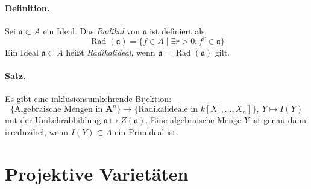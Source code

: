 \documentclass[11pt,b5paper,openany]{memoir}
\begin{document}
\paragraph{Definition.} Sei $\mathfrak{a}\subset A$ ein Ideal. Das \textit{Radikal} von $\mathfrak{a}$ ist definiert als:
\[\operatorname{Rad}(\mathfrak{a})=\{f\in A\mid\exists r>0\colon f^r\in\mathfrak{a} \} \]
Ein Ideal $\mathfrak{a}\subset A$ heißt \textit{Radikalideal}, wenn $\mathfrak{a}=\operatorname{Rad}(\mathfrak{a})$ gilt.

\paragraph{Satz.} Es gibt eine inklusionsumkehrende Bijektion:
\[\{\text{Algebraische Mengen in }\mathbf{A}^n\} \to \{\text{Radikalideale in }k[X_1,\ldots,X_n]\},\ Y\mapsto I(Y) \]
mit der Umkehrabbildung $\mathfrak{a}\mapsto Z(\mathfrak{a})$. Eine algebraische Menge $Y$ ist genau dann irreduzibel, wenn $I(Y)\subset A$ ein Primideal ist.

\section{Projektive Varietäten}
\end{document}
